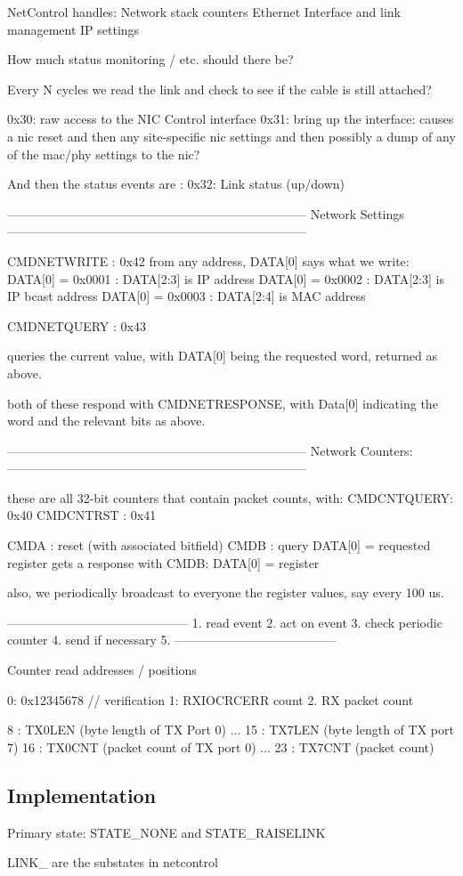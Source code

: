 NetControl handles: 
   Network stack counters
   Ethernet Interface and link management
   IP settings


How much status monitoring / etc. should there be? 

Every N cycles we read the link and check to see if the cable
is still attached? 

0x30: raw access to the NIC Control interface
0x31: bring up the interface:
    causes a nic reset
    and then any site-specific nic settings
    and then possibly a dump of any of the mac/phy settings to the nic? 

And then the status events are : 
0x32: Link status (up/down)



------------------------------------------------------------------------
Network Settings
------------------------------------------------------------------------

CMDNETWRITE : 0x42
from any address, DATA[0] says what we write:
    DATA[0] = 0x0001 : DATA[2:3] is IP address
    DATA[0] = 0x0002 : DATA[2:3] is IP bcast address
    DATA[0] = 0x0003 : DATA[2:4] is MAC address

CMDNETQUERY : 0x43

queries the current value, with DATA[0] being the requested word,
returned as above.

both of these respond with CMDNETRESPONSE, with Data[0] indicating
the word and the relevant bits as above. 

------------------------------------------------------------------------
Network Counters:
------------------------------------------------------------------------

these are all 32-bit counters that contain packet counts, with: 
CMDCNTQUERY: 0x40
CMDCNTRST : 0x41

CMDA : reset (with associated bitfield)
CMDB : query DATA[0] = requested register
   gets a response with 
   CMDB: DATA[0] = register

   also, we periodically broadcast to everyone the register values,
   say every 100 us.


--------------------------------------------
1. read event
2. act on event
3. check periodic counter
4. send if necessary
5. 
---------------------------------------

Counter read addresses / positions

0: 0x12345678 // verification
1: RXIOCRCERR count
2. RX packet count

8 : TX0LEN (byte length of TX Port 0)
...
15 : TX7LEN (byte length of TX port 7)
16 : TX0CNT (packet count of TX port 0)
...
23 : TX7CNT (packet count)


\subsection{Implementation}

Primary state: STATE_NONE and STATE_RAISELINK

LINK_ are the substates in netcontrol
